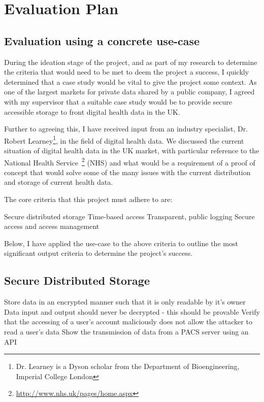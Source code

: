 \section{Evaluation Plan}

\subsection{Evaluation using a concrete use-case}

During the ideation stage of the project, and as part of my research to determine the criteria that would need to be met to deem the project a success, I quickly determined that a case study would be vital to give the project some context. As one of the largest markets for private data shared by a public company, I agreed with my supervisor that a suitable case study would be to provide secure accessible storage to front digital health data in the UK.

Further to agreeing this, I have received input from an industry specialist, Dr. Robert Learney\footnote{Dr. Learney is a Dyson scholar from the Department of Bioengineering, Imperial College London}, in the field of digital health data. We discussed the current situation of digital health data in the UK market, with particular reference to the National Health Service~\footnote{\url{http://www.nhs.uk/pages/home.aspx}} (NHS) and what would be a requirement of a proof of concept that would solve some of the many issues with the current distribution and storage of current health data.

The core criteria that this project must adhere to are:

\begin{outline}
  \1 Secure distributed storage
  \1 Time-based access
  \1 Transparent, public logging
  \1 Secure access and access management
\end{outline}

Below, I have applied the use-case to the above criteria to outline the most significant output criteria to determine the project's success.

\subsection{Secure Distributed Storage}

\begin{outline}
  \1 Store data in an encrypted manner such that it is only readable by it's owner
  \1 Data input and output should never be decrypted - this should be provable
  \1 Verify that the accessing of a user's account maliciously does not allow the attacker to read a user's data
  \1 Show the transmission of data from a PACS server using an API
\end{outline}

